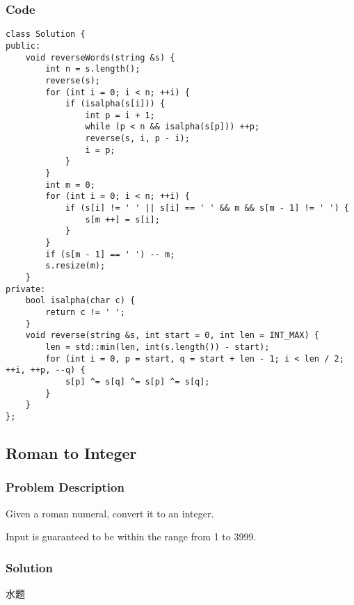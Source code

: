 \documentclass[courier]{article}
\begin{document}
\begin{CJK*}{UTF8}{gkai}
\subsubsection*{Code}
\begin{lstlisting}
class Solution {
public:
    void reverseWords(string &s) {
        int n = s.length();
        reverse(s);
        for (int i = 0; i < n; ++i) {
            if (isalpha(s[i])) {
                int p = i + 1;
                while (p < n && isalpha(s[p])) ++p;
                reverse(s, i, p - i);
                i = p;
            }
        }
        int m = 0;
        for (int i = 0; i < n; ++i) {
            if (s[i] != ' ' || s[i] == ' ' && m && s[m - 1] != ' ') {
                s[m ++] = s[i];
            }
        }
        if (s[m - 1] == ' ') -- m;
        s.resize(m);
    }
private:
    bool isalpha(char c) {
        return c != ' ';
    }
    void reverse(string &s, int start = 0, int len = INT_MAX) {
        len = std::min(len, int(s.length()) - start);
        for (int i = 0, p = start, q = start + len - 1; i < len / 2; ++i, ++p, --q) {
            s[p] ^= s[q] ^= s[p] ^= s[q];
        }
    }
}; 
\end{lstlisting}


\subsection{ Roman to Integer }

\subsubsection*{Problem Description}
Given a roman numeral, convert it to an integer.

Input is guaranteed to be within the range from 1 to 3999.



\subsubsection*{Solution}
水题


\end{CJK*}
\end{document}
